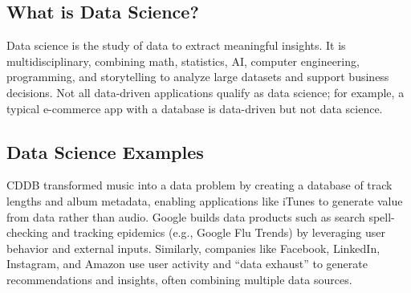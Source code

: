 \subsection{What is Data Science?}

Data science is the study of data to extract meaningful insights. It is multidisciplinary, combining math, statistics, AI, computer engineering, programming, and storytelling to analyze large datasets and support business decisions. Not all data-driven applications qualify as data science; for example, a typical e-commerce app with a database is data-driven but not data science.


\subsection{Data Science Examples}

CDDB transformed music into a data problem by creating a database of track lengths and album metadata, enabling applications like iTunes to generate value from data rather than audio. Google builds data products such as search spell-checking and tracking epidemics (e.g., Google Flu Trends) by leveraging user behavior and external inputs. Similarly, companies like Facebook, LinkedIn, Instagram, and Amazon use user activity and “data exhaust” to generate recommendations and insights, often combining multiple data sources.


